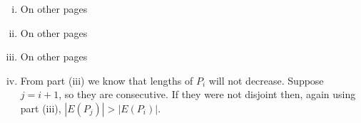 \newcommand{\sheet}{3}




\maketitle

\begin{exercise}{2}
    \begin{enumerate}[i)]
        \item{
                On other pages
        }
        \item{
                On other pages
        }
        \item{
                On other pages
            }
        \item{
                From part (iii) we know that lengths of $P_i$ will not decrease.
                Suppose $j = i + 1$, so they are consecutive. If they were not
                disjoint then, again using part (iii), $|E(P_j)| > |E(P_i)|$.

}
\end{enumerate}
\end{exercise}
